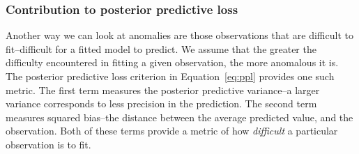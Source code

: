 \subsubsection{Contribution to posterior predictive loss}
Another way we can look at anomalies are those observations that are difficult to fit--difficult for
  a fitted model to predict.  We assume that the greater the difficulty encountered in fitting a given
  observation, the more anomalous it is.  The posterior predictive loss criterion in Equation~\ref{eq:ppl}
  provides one such metric.  The first term measures the posterior predictive variance--a larger variance
  corresponds to less precision in the prediction.  The second term measures squared bias--the distance
  between the average predicted value, and the observation.  Both of these terms provide a metric of
  how \emph{difficult} a particular observation is to fit.






%
